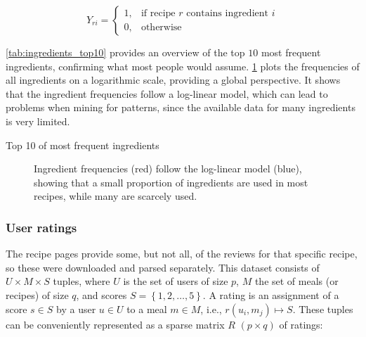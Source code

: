 \begin{equation*}
	\tag{Ingredient matrix}
	Y_{ri}=
	\begin{cases}
	    1,& \text{if recipe } r \text{ contains ingredient } i \\
	    0,& \text{otherwise}
	\end{cases}
\end{equation*}

\cref{tab:ingredients_top10} provides an overview of the top $10$ most frequent ingredients, confirming what most people would assume.
\cref{fig:ingredient_frequencies} plots the frequencies of all ingredients on a logarithmic scale, providing a global perspective.
It shows that the ingredient frequencies follow a log-linear model, which can lead to problems when mining for patterns, since the available data for many ingredients is very limited.

\begin{table}[htbp]
	\caption{Top 10 of most frequent ingredients}
	\label{tab:ingredients_top10}
	
	\centering
		
\end{table}

\begin{figure}[htbp]
	\centering
	
	\caption{Ingredient frequencies (red) follow the log-linear model (blue), showing that a small proportion of ingredients are used in most recipes, while many are scarcely used.}
	\label{fig:ingredient_frequencies}
\end{figure}




\subsubsection{User ratings}
\label{subsubsec:user_ratings}

The recipe pages provide some, but not all, of the reviews for that specific recipe, so these were downloaded and parsed separately.
This dataset consists of $U \times M \times S$ tuples, where $U$ is the set of users of size $p$, $M$ the set of meals (or recipes) of size $q$, and scores $S=\left\{1, 2, \dots, 5\right\}$.
A rating is an assignment of a score $s \in S$ by a user $u \in U$ to a meal $m \in M$, i.e., $r(u_i, m_j) \mapsto S$.
These tuples can be conveniently represented as a sparse matrix $R$ $(p \times q)$ of ratings:

